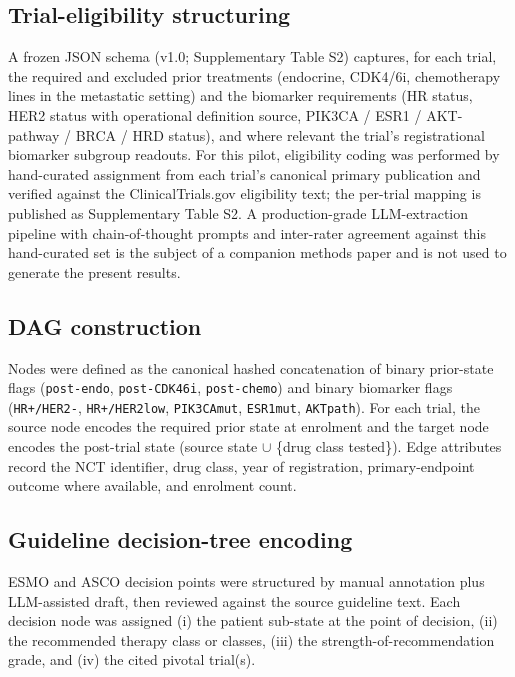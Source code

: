 \documentclass[11pt,a4paper]{article}
\begin{document}
\subsection{Trial-eligibility structuring}
A frozen JSON schema (v1.0; Supplementary Table S2) captures, for each trial, the required and excluded prior treatments (endocrine, CDK4/6i, chemotherapy lines in the metastatic setting) and the biomarker requirements (HR status, HER2 status with operational definition source, PIK3CA / ESR1 / AKT-pathway / BRCA / HRD status), and where relevant the trial's registrational biomarker subgroup readouts. For this pilot, eligibility coding was performed by hand-curated assignment from each trial's canonical primary publication and verified against the ClinicalTrials.gov eligibility text; the per-trial mapping is published as Supplementary Table S2. A production-grade LLM-extraction pipeline with chain-of-thought prompts and inter-rater agreement against this hand-curated set is the subject of a companion methods paper and is not used to generate the present results.

\subsection{DAG construction}
Nodes were defined as the canonical hashed concatenation of binary prior-state flags (\texttt{post-endo}, \texttt{post-CDK46i}, \texttt{post-chemo}) and binary biomarker flags (\texttt{HR+/HER2-}, \texttt{HR+/HER2low}, \texttt{PIK3CAmut}, \texttt{ESR1mut}, \texttt{AKTpath}). For each trial, the source node encodes the required prior state at enrolment and the target node encodes the post-trial state (source state $\cup$ \{drug class tested\}). Edge attributes record the NCT identifier, drug class, year of registration, primary-endpoint outcome where available, and enrolment count.

\subsection{Guideline decision-tree encoding}
ESMO and ASCO decision points were structured by manual annotation plus LLM-assisted draft, then reviewed against the source guideline text. Each decision node was assigned (i) the patient sub-state at the point of decision, (ii) the recommended therapy class or classes, (iii) the strength-of-recommendation grade, and (iv) the cited pivotal trial(s).
\end{document}
